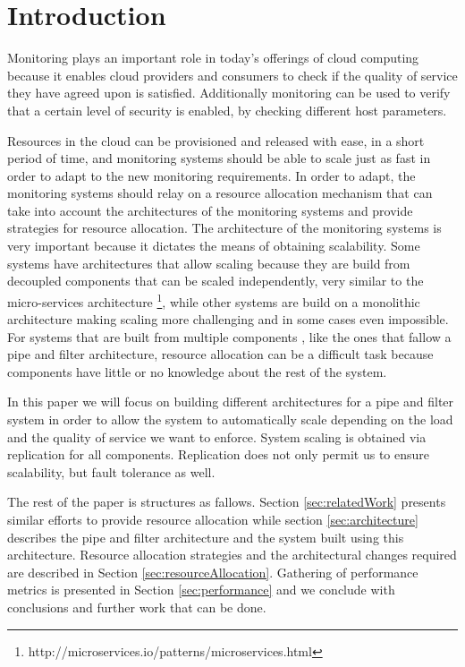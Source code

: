 \section*{Introduction}

Monitoring plays an important role in today's offerings of cloud computing because it enables cloud providers and consumers to check if the quality of service they have agreed upon is satisfied. Additionally monitoring can be used to verify that a certain level of security is enabled, by checking different host parameters.

Resources in the cloud can be provisioned and released with ease, in a short period of time, and monitoring systems should be able to scale just as fast in order to adapt to the new monitoring requirements. In order to adapt, the monitoring systems should relay on a resource allocation mechanism that can take into account the architectures of the monitoring systems and provide strategies for resource allocation. The architecture of the monitoring systems is very important because it dictates the means of obtaining scalability. Some systems have architectures that allow scaling because they are build from decoupled components that can be scaled independently, very similar to the micro-services architecture \footnote{http://microservices.io/patterns/microservices.html}, while other systems are build on a monolithic architecture making scaling more challenging and in some cases even impossible. For systems that are built from multiple components , like the ones that fallow a pipe and filter architecture, resource allocation can be a difficult task because components have little or no knowledge about the rest of the system.


In this paper we will focus on building different architectures for a pipe and filter system in order to allow the system to automatically scale depending on the load and the quality of service we want to enforce. System scaling is obtained via replication for all components. Replication does not only permit us to ensure scalability, but fault tolerance as well.

The rest of the paper is structures as fallows. Section \ref{sec:relatedWork} presents similar efforts to provide resource allocation while section \ref{sec:architecture} describes the pipe and filter architecture and the system built using this architecture. Resource allocation strategies and the architectural changes required are described in Section \ref{sec:resourceAllocation}. Gathering of performance metrics is presented in Section \ref{sec:performance} and we conclude with conclusions and further work that can be done.
